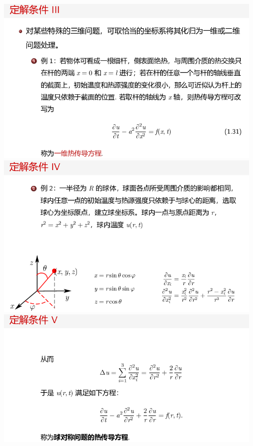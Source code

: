 \documentclass[11pt,a4paper]{ctexart}
\begin{document}
\begin{paracol}{2}
\includegraphics[width=\linewidth]{chap01_36.png}
\includegraphics[width=\linewidth]{chap01_37.png}
\includegraphics[width=\linewidth]{chap01_38.png}
\newpage


\end{paracol}
\end{document}

